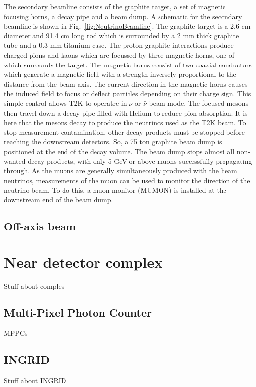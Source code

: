 \newline
The secondary beamline consists of the graphite target, a set of magnetic focusing horns, a decay pipe and a beam dump.  A schematic for the secondary beamline is shown in Fig.~\ref{fig:NeutrinoBeamline}.  The graphite target is a 2.6 cm diameter and 91.4 cm long rod which is surrounded by a 2 mm thick graphite tube and a 0.3 mm titanium case.  The proton-graphite interactions produce charged pions and kaons which are focussed by three magnetic horns, one of which surrounds the target.  The magnetic horns consist of two coaxial conductors which generate a magnetic field with a strength inversely proportional to the distance from the beam axis.  The current direction in the magnetic horns causes the induced field to focus or deflect particles depending on their charge sign.  This simple control allows T2K to operatre in $\nu$ or $\bar{\nu}$ beam mode.  The focused mesons then travel down a decay pipe filled with Helium to reduce pion absorption.  It is here that the mesons decay to produce the neutrinos used as the T2K beam.  To stop measurement contamination, other decay products must be stopped before reaching the downstream detectors.  So, a 75 ton graphite beam dump is positioned at the end of the decay volume.  The beam dump stops almost all non-wanted decay products, with only 5 GeV or above muons successfully propagating through.  As the muons are generally simultaneously produced with the beam neutrinos, measurements of the muon can be used to monitor the direction of the neutrino beam.  To do this, a muon monitor (MUMON) is installed at the downstream end of the beam dump.

\subsection{Off-axis beam}
\label{subsec:OffAxisBeam}


\section{Near detector complex}
\label{sec:NearDetectorComplex}
Stuff about comples

\subsection{Multi-Pixel Photon Counter}
\label{subsec:MPPC}
MPPCs

\subsection{INGRID}
\label{subsec:INGRID}
Stuff about INGRID

